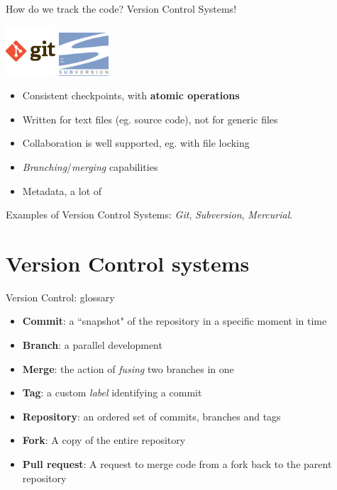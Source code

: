 \begin{frame}[fragile]{How do we track the code? Version Control Systems!}

\begin{center}
\includegraphics[width=5em]{git-logo}
\hspace{10em}
\includegraphics[width=5em]{subversion-logo}
\end{center}

\begin{itemize}
  \item Consistent checkpoints, with \textbf{atomic operations}
  \item Written for text files (eg. source code), not for generic files
  \item Collaboration is well supported, eg. with file locking
  \item \textit{Branching}/\textit{merging} capabilities
  \item Metadata, a lot of
\end{itemize}

Examples of Version Control Systems: \textit{Git}, \textit{Subversion},
\textit{Mercurial}.

\end{frame}


\section{Version Control systems}

\begin{frame}[fragile]{Version Control: glossary}

\begin{itemize}
  \item \textbf{Commit}: a ``snapshot" of the repository in a specific moment in time
  \item \textbf{Branch}: a parallel development
  \item \textbf{Merge}: the action of \textit{fusing} two branches in one
  \item \textbf{Tag}: a custom \textit{label} identifying a commit
  \item \textbf{Repository}: an ordered set of commits, branches and tags
  \item \textbf{Fork}: A copy of the entire repository
  \item \textbf{Pull request}: A request to merge code from a fork back to the
  parent repository
\end{itemize}

\end{frame}


